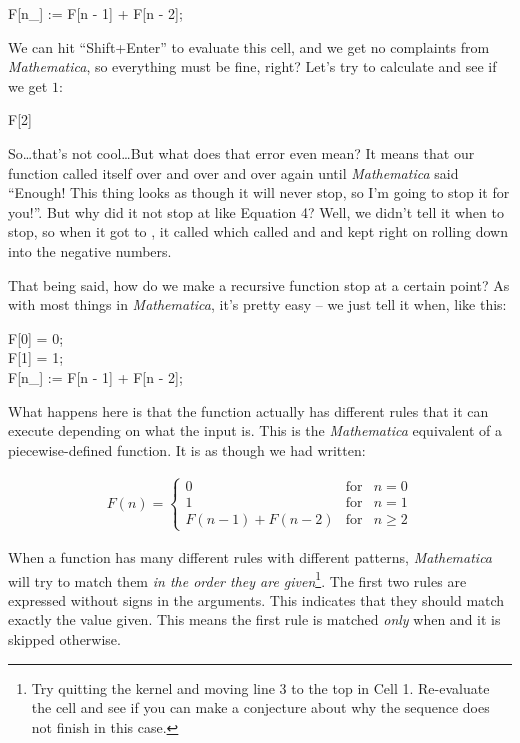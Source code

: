 \begin{code}
	   F[n\_] := F[n - 1] + F[n - 2];
\end{code}

We can hit ``Shift+Enter'' to evaluate this cell, and we get no complaints from \emph{Mathematica}, so everything must be fine, right? Let's try to calculate  and see if we get $1$:

\begin{code}
	   F[2]\\
\end{code}

So\ldots that's not cool\ldots But what does that error even mean? It means that our function  called itself over and over and over again until \emph{Mathematica} said ``Enough! This thing looks as though it will never stop, so I'm going to stop it for you!''. But why did it not stop at  like Equation 4? Well, we didn't tell it when to stop, so when it got to , it called  which called  and  and kept right on rolling down into the negative numbers.

That being said, how do we make a recursive function stop at a certain point? As with most things in \emph{Mathematica}, it's pretty easy -- we just tell it when, like this:

\begin{code}
	   F[0] = 0;\\
	   F[1] = 1;\\
	   F[n\_] := F[n - 1] + F[n - 2];
\end{code}

What happens here is that the function  actually has different rules that it can execute depending on what the input is. This is the \emph{Mathematica} equivalent of a piecewise-defined function. It is as though we had written:

\begin{align}
	   F(n) = \left\{ \begin{array}{rcl}
			 0 & \mbox{for} & n = 0 \\
			 1 & \mbox{for} & n = 1 \\
			 F(n-1) + F(n-2) & \mbox{for} & n \geq 2
	   \end{array}\right.
\end{align}

When a function has many different rules with different patterns, \emph{Mathematica} will try to match them \emph{in the order they are given}\footnote{Try quitting the kernel and moving line 3 to the top in Cell 1. Re-evaluate the cell and see if you can make a conjecture about why the sequence does not finish in this case.}. The first two rules are expressed without \expr{\_} signs in the arguments. This indicates that they should match exactly the value given. This means the first rule is matched \emph{only} when  and it is skipped otherwise.


